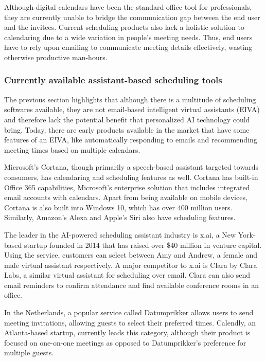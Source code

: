 \documentclass{article}
\begin{document}
Although digital calendars have been the standard office tool for professionals, they are currently unable to bridge the communication gap between the end user and the invitees. Current scheduling products also lack a holistic solution to calendaring due to a wide variation in people’s meeting needs. Thus, end users have to rely upon emailing to communicate meeting details effectively, wasting otherwise productive man-hours.

\subsubsection{Currently available assistant-based scheduling tools}

The previous section highlights that although there is a multitude of scheduling softwares available, they are not email-based intelligent virtual assistants (EIVA) and therefore lack the potential benefit that personalized AI technology could bring. Today, there are early products available in the market that have some features of an EIVA, like automatically responding to emails and recommending meeting times based on multiple calendars.

Microsoft’s Cortana, though primarily a speech-based assistant targeted towards consumers, has calendaring and scheduling features as well. Cortana has built-in Office 365 capabilities, Microsoft’s enterprise solution that includes integrated email accounts with calendars. Apart from being available on mobile devices, Cortana is also built into Windows 10, which has over 400 million users. Similarly, Amazon’s Alexa and Apple’s Siri also have scheduling features.

The leader in the AI-powered scheduling assistant industry is x.ai, a New York-based startup founded in 2014 that has raised over \$40 million in venture capital. Using the service, customers can select between Amy and Andrew, a female and male virtual assistant respectively. A major competitor to x.ai is Clara by Clara Labs, a similar virtual assistant for scheduling over email. Clara can also send email reminders to confirm attendance and find available conference rooms in an office.

In the Netherlands, a popular service called Datumprikker allows users to send meeting invitations, allowing guests to select their preferred times. Calendly, an Atlanta-based startup, currently leads this category, although their product is focused on one-on-one meetings as opposed to Datumprikker’s preference for multiple guests.
\end{document}
